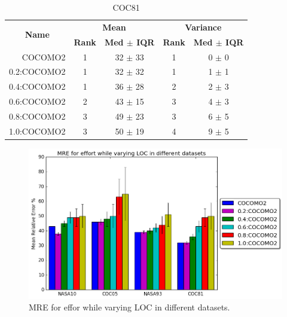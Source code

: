 \documentclass[final,twocolumn,5p]{elsarticle}
\begin{document}
\begin{table}[!htpb]
\centering
\caption{COC81}
\scriptsize
\label{tab:coc81}
\begin{tabular}{|r|c|c|c|c|}
\hline
\multicolumn{1}{|c|}{\multirow{2}{*}{\textbf{Name}}} & \multicolumn{2}{c|}{\textbf{Mean}}     & \multicolumn{2}{c|}{\textbf{Variance}} \\ \cline{2-5} 
\multicolumn{1}{|c|}{}                               & \textbf{Rank} & \textbf{Med $\pm$ IQR} & \textbf{Rank} & \textbf{Med $\pm$ IQR} \\ \hline
COCOMO2                                              & 1             & 32 $\pm$ 33            & 1             & 0 $\pm$ 0              \\
0.2:COCOMO2                                          & 1             & 32 $\pm$ 32            & 1             & 1 $\pm$ 1              \\ \cline{4-5}
0.4:COCOMO2                                          & 1             & 36 $\pm$ 28            & 2             & 2 $\pm$ 3              \\ \cline{2-5}
0.6:COCOMO2                                          & 2             & 43 $\pm$ 15            & 3             & 4 $\pm$ 3              \\ \cline{2-3}
0.8:COCOMO2                                          & 3             & 49 $\pm$ 23            & 3             & 6 $\pm$ 5              \\ \cline{4-5}
1.0:COCOMO2                                          & 3             & 50 $\pm$ 19            & 4             & 9 $\pm$ 5      \\ \hline       
\end{tabular}
\end{table}

 
\begin{figure}
    \centering
    \includegraphics[scale=0.5]{Figs/mre.png}
    \caption{MRE for effor while varying LOC in different datasets.}
    \label{fig:mre_datasets}
\end{figure}
\end{document}
